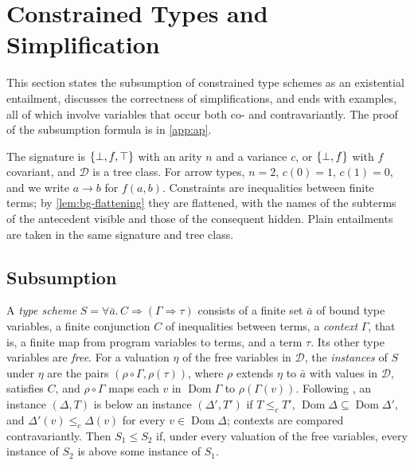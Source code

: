 
\providecommand{\parity}{\operatorname{par}}

\section{Constrained Types and Simplification}\label{sec:ap}

This section states the subsumption of constrained type schemes as an
existential entailment, discusses the correctness of simplifications, and
ends with examples, all of which involve variables that occur both co- and
contravariantly. The proof of the subsumption formula is in \cref{app:ap}.

The signature is $\{\bot,f,\top\}$ with an arity $n$ and a variance $c$, or $\{\bot,f\}$ with $f$
covariant, and $\mathcal D$ is a tree class. For arrow types, $n=2$, $c(0)=1$,
$c(1)=0$, and we write $a\to b$ for $f(a,b)$. Constraints are inequalities
between finite terms; by \cref{lem:bg-flattening} they are flattened, with the
names of the subterms of the antecedent visible and those of the consequent
hidden. Plain entailments are taken in the same signature and tree class.

\subsection{Subsumption}\label{sec:ap-subsumption}

A \emph{type scheme} $S=\forall\bar a.\,C\Rightarrow(\Gamma\Rightarrow\tau)$
consists of a finite set $\bar a$ of bound type variables, a finite
conjunction $C$ of inequalities between terms, a \emph{context} $\Gamma$, that
is, a finite map from program variables to terms, and a term $\tau$. Its other
type variables are \emph{free}. For a valuation $\eta$ of the free variables
in $\mathcal D$, the \emph{instances} of $S$ under $\eta$ are the pairs
$(\rho\circ\Gamma,\rho(\tau))$, where $\rho$ extends $\eta$ to $\bar a$ with
values in $\mathcal D$, satisfies $C$, and $\rho\circ\Gamma$ maps each $v$ in
$\operatorname{Dom}\Gamma$ to $\rho(\Gamma(v))$. Following
\citet[Section~4.2]{TrifonovSmith96}, an instance $(\Delta,T)$ is below an
instance $(\Delta',T')$ if $T\le_c T'$,
$\operatorname{Dom}\Delta\subseteq\operatorname{Dom}\Delta'$, and
$\Delta'(v)\le_c\Delta(v)$ for every $v\in\operatorname{Dom}\Delta$; contexts
are compared contravariantly. Then $S_1\le S_2$ if, under every valuation of
the free variables, every instance of $S_2$ is above some instance of $S_1$.

